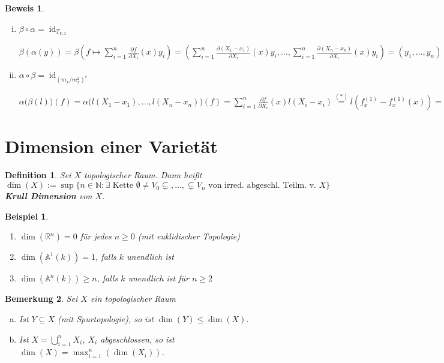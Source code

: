 \documentclass[a4paper, 12pt, numbers=noendperiod, chapterprefix=true]{scrbook}
\theoremstyle{break}
\newtheorem{Def}{Definition}[section]
\newtheorem{Bem}[Def]{Bemerkung}
\theoremstyle{nonumberbreak}
\newtheorem{nnBsp}{Beispiel}
\newtheorem{Bew}{Beweis}
\theoremstyle{nonumberplain}
\newcommand{\emp}[1]{\textbf{\emph{#1}}}
\newcommand{\defterm}[1]{{\index{#1}}\emp{#1}}
\newcommand{\Sum}{\sum\limits}
\DeclareMathOperator{\id}{id}
\newcommand{\R}{\mathbb{R}}
\newcommand{\N}{\mathbb{N}}
\newcommand{\A}{\mathbb{A}}
\begin{document}
\begin{Bew}
\begin{enumerate}[i)]
	\emph{Behauptung:} $f_x^{(1)}-f_x^{(1)}(x)\in m_x^2$
	
	\emph{denn:} Taylor-Entwicklung $\underbrace{f}_{0\text{ in }k[V]}= \underbrace{f(x)}_{=0\text{, weil }f\in I(V)}+f_x^{(1)}-f_x^{(1)}(x)+ $Terme in $m_x^2$
\item
	$\beta\circ\alpha=\id_{T_{V,x}}$
	
	$\beta(\alpha(y))= \beta(f\mapsto\Sum_{i=1}^n\frac{\partial f}{\partial X_i}(x)y_i) = \left(\Sum_{i=1}^n\frac{\partial(X_1-x_1)}{\partial X_i}(x)y_i,\ldots ,\Sum_{i=1}^n\frac{\partial(X_n-x_n)}{\partial X_i}(x)y_i\right) = (y_1,\ldots ,y_n)$
\item
	$\alpha\circ\beta=\id_{(m_x/m_x^2)^v}$
	
	$\alpha\bigl(\beta(l)\bigr)(f)= \alpha\bigl(l(X_1-x_1),\ldots ,l(X_n-x_n)\bigr)(f) = \Sum_{i=1}^n\frac{\partial f}{\partial X_i}(x)l(X_i-x_i) \overset{(*)}{=} l\left(f_x^{(1)}-f_x^{(1)}(x)\right) = l(\overline f)$
\end{enumerate}\end{Bew}

\newpage


\section{Dimension einer Variet\"at}

\begin{Def}
Sei $X$ topologischer Raum. Dann hei\ss t
	\[\dim(X):=\sup\{n\in\N:\exists\text{ Kette }\emptyset\ne V_0\subsetneq,\ldots ,\subsetneq V_n\text{ von irred. abgeschl. Teilm. v. }X\}\]
\defterm{Krull Dimension} von $X$.
\end{Def}

\begin{nnBsp}\begin{enumerate}[1)]
\item
	$\dim(\R^n)=0$ f\"ur jedes $n\ge0$ (mit euklidischer Topologie)
\item
	$\dim(\A^1(k))=1$, falls $k$ unendlich ist
\item
	$\dim(\A^n(k))\ge n$, falls $k$ unendlich ist f\"ur $n\ge2$
\end{enumerate}\end{nnBsp}

\begin{Bem}\label{bem18.2}
Sei $X$ ein topologischer Raum\begin{enumerate}[a)]
\item
	Ist $Y\subseteq X$ (mit Spurtopologie), so ist $\dim(Y)\le\dim(X)$.
\item\label{bem18.2b}
	Ist $X=\bigcup\limits_{i=1}^nX_i$, $X_i$ abgeschlossen, so ist $\dim(X)=\max_{i=1}^n(\dim(X_i))$.
\end{enumerate}\end{Bem}
\end{document}
